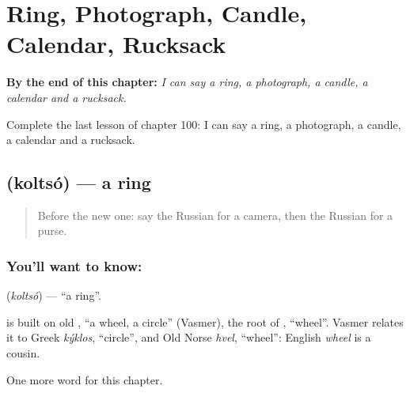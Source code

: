
\chapter{Ring, Photograph, Candle, Calendar, Rucksack}
\label{ch:ru-ring-photograph-candle-calendar-rucksack}

\begin{chapteropening}
\textbf{By the end of this chapter:} \emph{I can say a ring, a photograph, a candle, a calendar and a rucksack.}

Complete the last lesson of chapter 100: I can say a ring, a photograph, a candle, a calendar and a rucksack.
\end{chapteropening}

\section[\texorpdfstring{\ru{кольцо} (koltsó)}{кольцо (koltsó)}]{ (koltsó) — a ring}

\label{lesson:RU-C100-ring}



\begin{quote}
Before the new one: say the Russian for a camera, then the Russian for a purse.
\end{quote}

\subsection*{You'll want to know: }
\textbf{} (\emph{koltsó}) — \textquotedblleft{}a ring\textquotedblright{}.

\begin{cousinweb}
\textbf{} is built on old \emph{}, \textquotedblleft{}a wheel, a circle\textquotedblright{} (Vasmer), the root of \emph{}, \textquotedblleft{}wheel\textquotedblright{}. Vasmer relates it to Greek \emph{kýklos}, \textquotedblleft{}circle\textquotedblright{}, and Old Norse \emph{hvel}, \textquotedblleft{}wheel\textquotedblright{}: English \emph{wheel} is a cousin.
\end{cousinweb}

\begin{grammarlens}[title={What you've built}]
One more word for this chapter.
\end{grammarlens}

